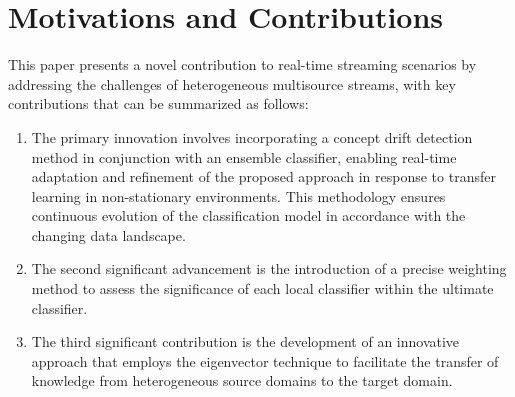 \section{Motivations and Contributions} \label{sec:6_2_motivation}
This paper presents a novel contribution to real-time streaming scenarios by addressing the challenges of heterogeneous multisource streams, with key contributions that can be summarized as follows:
\begin{enumerate}[nosep]
  \item The primary innovation involves incorporating a concept drift detection method in conjunction with an ensemble classifier, enabling real-time adaptation and refinement of the proposed approach in response to transfer learning in non-stationary environments. This methodology ensures continuous evolution of the classification model in accordance with the changing data landscape.
  \item The second significant advancement is the introduction of a precise weighting method to assess the significance of each local classifier within the ultimate classifier.
 \item The third significant contribution is the development of an innovative approach that employs the eigenvector technique to facilitate the transfer of knowledge from heterogeneous source domains to the target domain.
  \end{enumerate} 
 
   

